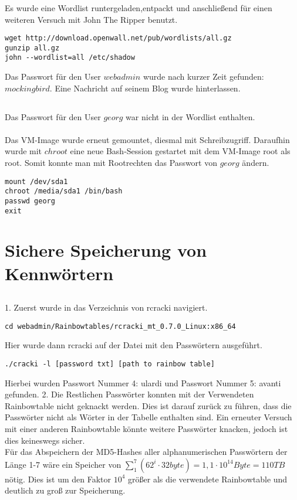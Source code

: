 \documentclass[12pt]{article}
\theoremstyle{plain}
\begin{document}
\subsubsection{}
Es wurde eine Wordlist runtergeladen,entpackt und anschließend für einen weiteren Versuch mit John The Ripper benutzt.
\begin{lstlisting}
wget http://download.openwall.net/pub/wordlists/all.gz
gunzip all.gz
john --wordlist=all /etc/shadow
\end{lstlisting}
Das Passwort für den User $webadmin$ wurde nach kurzer Zeit gefunden: $mockingbird$. Eine Nachricht auf seinem Blog wurde hinterlassen.
\subsection{}
Das Passwort für den User $georg$ war nicht in der Wordlist enthalten. \\ \\
Das VM-Image wurde erneut gemountet, diesmal mit Schreibzugriff. Daraufhin wurde mit $chroot$ eine neue Bash-Session gestartet mit dem VM-Image root als root. Somit konnte man mit Rootrechten das Passwort von $georg$ ändern.
\begin{lstlisting}
mount /dev/sda1
chroot /media/sda1 /bin/bash
passwd georg
exit
\end{lstlisting}
\section{Sichere Speicherung von Kennwörtern}
\subsection{}
1.	Zuerst wurde in das Verzeichnis von rcracki navigiert.
\begin{lstlisting}
cd webadmin/Rainbowtables/rcracki_mt_0.7.0_Linux:x86_64
\end{lstlisting}
Hier wurde dann rcracki auf der Datei mit den Passwörtern ausgeführt.
\begin{lstlisting}
./cracki -l [password txt] [path to rainbow table]
\end{lstlisting}
Hierbei wurden Passwort Nummer 4: ulardi und Passwort Nummer 5: avanti gefunden.
2.	Die Restlichen Passwörter konnten mit der Verwendeten Rainbowtable nicht geknackt werden. Dies ist darauf zurück zu führen, dass die Passwörter nicht als Wörter in der Tabelle enthalten sind. Ein erneuter Versuch mit einer anderen Rainbowtable könnte weitere Passwörter knacken, jedoch ist dies keineswegs sicher.\\
Für das Abspeichern der MD5-Hashes aller alphanumerischen Passwörtern der Länge 1-7 wäre ein Speicher von $\sum_1^7 (62^i \cdot 32 byte) = 1,1 \cdot 10^{14} Byte = 110 TB$ nötig. Dies ist um den Faktor $10^4$ größer als die verwendete Rainbowtable und deutlich zu groß zur Speicherung.
\end{document}
